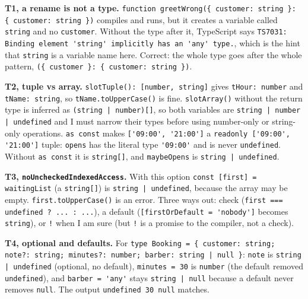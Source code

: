 \textbf{T1, a rename is not a type.} \passthrough{\lstinline!function greetWrong(\{ customer: string \}: \{ customer: string \})!} compiles and runs,
but it creates a variable called \passthrough{\lstinline!string!} and no \passthrough{\lstinline!customer!}. Without the type after it, TypeScript says
\passthrough{\lstinline!TS7031: Binding element 'string' implicitly has an 'any' type.!}, which is the hint that \passthrough{\lstinline!string!} is a variable name here.
Correct: the whole type goes after the whole pattern, \passthrough{\lstinline!(\{ customer \}: \{ customer: string \})!}.

\textbf{T2, tuple vs array.} \passthrough{\lstinline!slotTuple(): [number, string]!} gives \passthrough{\lstinline!tHour: number!} and \passthrough{\lstinline!tName: string!}, so \passthrough{\lstinline!tName.toUpperCase()!} is fine.
\passthrough{\lstinline!slotArray()!} without the return type is inferred as \passthrough{\lstinline!(string | number)[]!}, so both variables are \passthrough{\lstinline!string | number | undefined!} and
I must narrow their types before using number-only or string-only operations. \passthrough{\lstinline!as const!} makes \passthrough{\lstinline!['09:00', '21:00']!} a \passthrough{\lstinline!readonly ['09:00', '21:00']!} tuple: \passthrough{\lstinline!opens!} has the
literal type \passthrough{\lstinline!'09:00'!} and is never \passthrough{\lstinline!undefined!}. Without \passthrough{\lstinline!as const!} it is \passthrough{\lstinline!string[]!}, and \passthrough{\lstinline!maybeOpens!} is \passthrough{\lstinline!string | undefined!}.

\textbf{T3, \passthrough{\lstinline!noUncheckedIndexedAccess!}.} With this option \passthrough{\lstinline!const [first] = waitingList!} (a \passthrough{\lstinline!string[]!}) is \passthrough{\lstinline!string | undefined!}, because
the array may be empty. \passthrough{\lstinline!first.toUpperCase()!} is an error. Three ways out: check (\passthrough{\lstinline!first === undefined ? ... : ...!}),
a default (\passthrough{\lstinline![firstOrDefault = 'nobody']!} becomes \passthrough{\lstinline!string!}), or \passthrough{\lstinline"!"} when I am sure (but \passthrough{\lstinline"!"} is a promise to the compiler, not a check).

\textbf{T4, optional and defaults.} For \passthrough{\lstinline!type Booking = \{ customer: string; note?: string; minutes?: number; barber: string | null \}!}:
\passthrough{\lstinline!note!} is \passthrough{\lstinline!string | undefined!} (optional, no default), \passthrough{\lstinline!minutes = 30!} is \passthrough{\lstinline!number!} (the default removed \passthrough{\lstinline!undefined!}), and
\passthrough{\lstinline!barber = 'any'!} stays \passthrough{\lstinline!string | null!} because a default never removes \passthrough{\lstinline!null!}. The output \passthrough{\lstinline!undefined 30 null!} matches.

